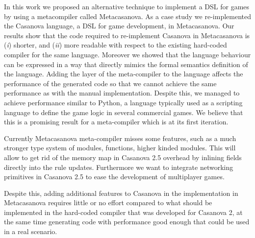 In this work we proposed an alternative technique to implement a DSL for games by using a metacompiler called Metacasanova. As a case study we re-implemented the Casanova language, a DSL for game development, in Metacasanova. Our results show that the code required to re-implement Casanova in Metacasanova is (\textit{i}) shorter, and (\textit{ii}) more readable with respect to the existing hard-coded compiler for the same language. Moreover we showed that the language behaviour can be expressed in a way that directly mimics the formal semantics definition of the language. Adding the layer of the meta-compiler to the language affects the performance of the generated code so that we cannot achieve the same performance as with the manual implementation. Despite this, we managed to achieve performance similar to Python, a language typically used as a scripting language to define the game logic in several commercial games. We believe that this is a promising result for a meta-compiler which is at its first iteration.

Currently Metacasanova meta-compiler misses some features, such as a much stronger type system of modules, functions, higher kinded modules. This will allow to get rid of the memory map in Casanova 2.5 overhead by inlining fields directly into the rule updates. Furthermore we want to integrate networking primitives in Casanova 2.5 to ease the development of multiplayer games.

Despite this, adding additional features to Casanova in the implementation in Metacasanova requires little or no effort compared to what should be implemented in the hard-coded compiler that was developed for Casanova 2, at the same time generating code with performance good enough that could be used in a real scenario.